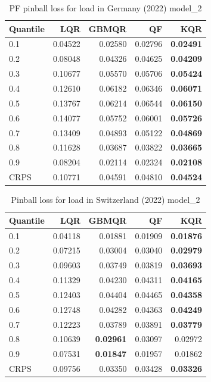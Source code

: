 \begin{table}[!ht]
    \centering
    \caption{PF pinball loss for load in Germany (2022) model\_2}
    \label{tab:energy_chart_de_additional_predictors}
    \begin{tabular}{lrrrr}
    \toprule
    Quantile & LQR & GBMQR & QF & KQR \\
    \midrule
    0.1 & 0.04522 & 0.02580 & 0.02796 & \textbf{0.02491} \\
    0.2 & 0.08048 & 0.04326 & 0.04625 & \textbf{0.04209} \\
    0.3 & 0.10677 & 0.05570 & 0.05706 & \textbf{0.05424} \\
    0.4 & 0.12610 & 0.06182 & 0.06346 & \textbf{0.06071}\\
    0.5 & 0.13767 & 0.06214 & 0.06544 & \textbf{0.06150} \\
    0.6 & 0.14077 & 0.05752 & 0.06001 & \textbf{0.05726} \\
    0.7 & 0.13409 & 0.04893 & 0.05122 & \textbf{0.04869} \\
    0.8 & 0.11628 & 0.03687 & 0.03822 & \textbf{0.03665} \\
    0.9 & 0.08204 & 0.02114 & 0.02324 & \textbf{0.02108} \\
    \midrule
    CRPS & 0.10771 & 0.04591 & 0.04810 & \textbf{0.04524} \\
    \bottomrule
    \end{tabular}
    \end{table}
    


\begin{table}[!ht]
    \centering
    \caption{Pinball loss for load in Switzerland (2022) model\_2}
    \label{tab:energy_chart_ch_additional_predictors}
    \begin{tabular}{lrrrr}
    \toprule
    Quantile & LQR & GBMQR & QF & KQR \\
    \midrule
    0.1 & 0.04118 & 0.01881 & 0.01909 & \textbf{0.01876} \\
    0.2 & 0.07215 & 0.03004 & 0.03040 & \textbf{0.02979} \\
    0.3 & 0.09603 & 0.03749 & 0.03819 & \textbf{0.03693} \\
    0.4 & 0.11329 & 0.04230 & 0.04311 & \textbf{0.04165} \\
    0.5 & 0.12403 & 0.04404 & 0.04465 & \textbf{0.04358} \\
    0.6 & 0.12748 & 0.04282 & 0.04363 & \textbf{0.04249} \\
    0.7 & 0.12223 & 0.03789 & 0.03891 & \textbf{0.03779} \\
    0.8 & 0.10639 & \textbf{0.02961} & 0.03097 & 0.02972 \\
    0.9 & 0.07531 & \textbf{0.01847} & 0.01957 & 0.01862 \\
    \midrule
    CRPS & 0.09756 & 0.03350 & 0.03428 & \textbf{0.03326} \\
    \bottomrule
    \end{tabular}
    \end{table}
    
